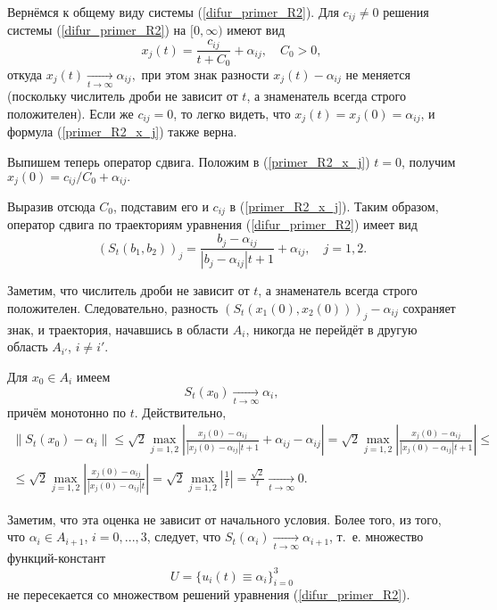 Вернёмся к общему виду системы (\ref{difur_primer_R2}).
Для $c_{ij} \neq 0$ решения системы (\ref{difur_primer_R2}) на $[0, \infty)$ имеют вид
\begin{equation}\label{primer_R2_x_j}
	x_j(t) = \frac{c_{ij}}{t+C_0}+\alpha_{ij}, \quad C_0 > 0,
\end{equation}
откуда
$
	x_j(t) \xrightarrow[t\to \infty ]{}{\alpha_{ij}},
$
при этом знак разности $x_j(t) - \alpha_{ij}$ не меняется (поскольку числитель дроби не зависит от $t$, а знаменатель всегда строго положителен).
Если же $c_{ij}=0$, то легко видеть, что $x_j(t) = x_j(0) = \alpha_{ij}$,
и формула (\ref{primer_R2_x_j}) также верна.

Выпишем теперь оператор сдвига.
Положим в (\ref{primer_R2_x_j}) $t=0$, получим
$
	x_j(0) = c_{ij}/{C_0}+\alpha_{ij}.
$

Выразив отсюда $C_0$, подставим его и $c_{ij}$ в (\ref{primer_R2_x_j}).
Таким образом, оператор сдвига по траекториям уравнения (\ref{difur_primer_R2}) имеет вид
\begin{equation}\label{primer_R2_oper_sdviga}
	(S_t(b_1,b_2))_j = \frac{b_{j}-\alpha_{ij}}{|b_{j}-\alpha_{ij}|t+1}+\alpha_{ij}, \quad j=1,2.
\end{equation}

Заметим, что числитель дроби не зависит от $t$, а знаменатель всегда строго положителен.
Следовательно, разность $(S_t(x_1(0), x_2(0)))_j - \alpha_{ij}$ сохраняет знак,
и траектория, начавшись в области $A_i$, никогда не перейдёт в другую область $A_{i'}$, $i \neq i'$.

Для $x_0 \in A_i$ имеем
\begin{equation}\label{primer_R2_stremlenie}
	S_t(x_0) \xrightarrow[t \to \infty]{} \alpha_{i},
\end{equation}
причём монотонно по $t$.
Действительно,
\begin{multline}\label{oper_sdviga_estimation}
	\|S_t(x_0) - \alpha_i\| \leq
	\sqrt{2} \max_{j=1,2} \left| \frac{x_{j}(0)-\alpha_{ij}}{|x_{j}(0)-\alpha_{ij}|t+1} + \alpha_{ij} - \alpha_{ij}  \right| =
	\sqrt{2} \max_{j=1,2} \left| \frac{x_{j}(0)-\alpha_{ij}}{|x_{j}(0)-\alpha_{ij}|t+1} \right| \leq
	\\ \leq
	\sqrt{2} \max_{j=1,2} \left| \frac{x_{j}(0)-\alpha_{ij}}{|x_{j}(0)-\alpha_{ij}|t} \right| =
	\sqrt{2} \max_{j=1,2} \left| \frac{1}{t} \right| =
	\frac{\sqrt{2}}{t} \xrightarrow[t \to \infty]{} 0.
\end{multline}

Заметим, что эта оценка не зависит от начального условия.
Более того, из того, что $\alpha_i \in A_{i+1}$, $i=0,...,3$,
следует, что $S_t(\alpha_i) \xrightarrow[t \to \infty]{} \alpha_{i+1}$,
т.~е. множество функций-констант
\begin{equation}\label{6}
	U = \{ u_i(t) \equiv \alpha_i \}_{i=0}^{3}
\end{equation}
не пересекается со множеством решений уравнения (\ref{difur_primer_R2}).

